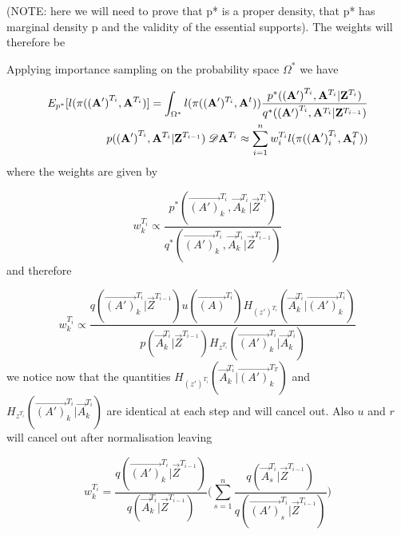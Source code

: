 {(NOTE: here we will need to prove that p* is a proper density, that p* has marginal density p and the validity of the essential supports).
The weights will therefore be 

Applying importance sampling on the probability space $\Omega^*$ we have

\begin{align*}
    E_{p^*}[l(\pi (\mathbf{(A')}^{T_i}, \mathbf{A}^{T_i})] = \int_{\Omega^*} l(\pi((\mathbf{A}')^{T_i}, \mathbf{A}^{t})) \frac{p^*(\mathbf{(A')}^{T_i}, \mathbf{A}^{T_i}|\mathbf{Z}^{T_i})} {q^*(\mathbf{(A')}^{T_i}, \mathbf{A}^{T_i} | \mathbf{Z}^{T_{i-1}})} \\
    p(\mathbf{(A')}^{T_i}, \mathbf{A}^{T_i} | \mathbf{Z}^{T_{i-1}}) \; \mathscr{D} \mathbf{A}^{T_i} \approx \sum_{i=1}^n  w^{T_i}_i l(\pi (\mathbf{(A')}^{T_i}_i, \mathbf{A}^{T}_i))
\end{align*}
where the weights are given by

\begin{equation*}
    w^{T_i}_k \propto \frac{p^*(\vec{(A')}^{T_i}_k, \vec{A}^{T_i}_k | \vec{Z}^{T_i})} {q^*(\vec{(A')}^{T_i}_k, \vec{A}^{T_i}_k | \vec{Z}^{T_{i-1}})}
\end{equation*}
and therefore

\begin{equation*}
    w^{T_i}_k \propto \frac{q(\vec{(A')}^{T_i}_k | \vec{Z}^{T_{i-1}}) u(\vec{(A)}^{T_i}) H_{(z')^{T_i}} (\vec{A}^{T_i}_k | \vec{(A')}^{T_i}_k)}{p(\vec{A}^{T_i}_k | \vec{Z}^{T_{i-1}}) H_{z^{T_i}} (\vec{(A')}^{T_i}_k | \vec{A}^{T_i}_k)}
\end{equation*}
we notice now that the quantities $H_{(z')^{T_i}} (\vec{A}^{T_i}_k | \vec{(A')}^{T_T}_k)$ and $H_{z^{T_i}} (\vec{(A')}^{T_i}_k | \vec{A}^{T_i}_k)$ are identical at each step and will cancel out. Also $u$ and $r$ will cancel out after normalisation leaving

\begin{equation*}
    w^{T_i}_k = \frac{q(\vec{(A')}^{T_i}_k | \vec{Z}^{T_{i-1}})}{q(\vec{A}^{T_i}_k | \vec{Z}^{T_{i-1}})} \Bigg( \sum_{s=1}^n \frac{q(\vec{A}^{T_i}_s | \vec{Z}^{T_{i-1}})}{q(\vec{(A')}^{T_i}_s | \vec{Z}^{T_{i-1}})} \Bigg)
\end{equation*}


}


